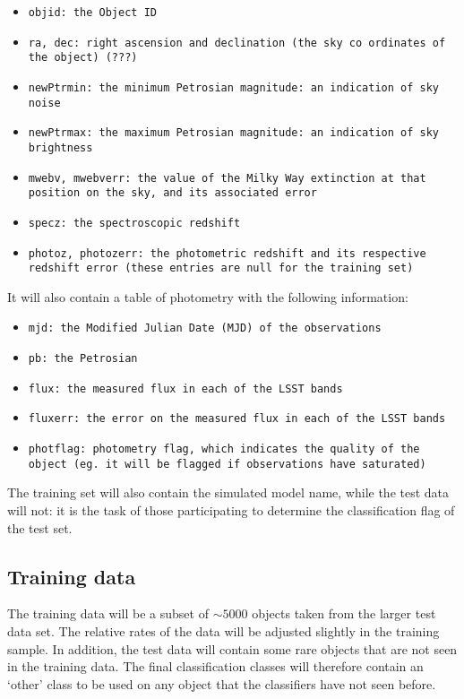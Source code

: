 \documentclass[\docopts]{\docclass}
\begin{document}
\begin{itemize}
\item \tt{objid}: the Object ID
\item \tt{ra, dec:} right ascension and declination (the sky co ordinates of the object) (???)
\item \tt{newPtrmin}: the minimum Petrosian magnitude: an indication of sky noise
\item \tt{newPtrmax}: the maximum Petrosian magnitude: an indication of sky brightness
\item \tt{mwebv, mwebverr}: the value of the Milky Way extinction at that position on the sky, and its associated error
\item \tt{specz}: the spectroscopic redshift
\item \tt{photoz, photozerr}: the photometric redshift and its respective redshift error (these entries are null for the training set)
\end{itemize}

It will also contain a table of photometry with the following information:
\begin{itemize}
\item \tt{mjd}: the Modified Julian Date (MJD) of the observations
\item \tt{pb}: the Petrosian 
\item \tt{flux}: the measured flux in each of the LSST bands
\item \tt{fluxerr}: the error on the measured flux in each of the LSST bands
\item \tt{photflag}: photometry flag, which indicates the quality of the object (eg. it will be flagged if observations have saturated)
\end{itemize}

The training set will also contain the simulated model name, while the test data will not: it is the task of those participating to determine the classification flag of the test set.

\subsection{Training data}
The training data will be a subset of $\sim 5000$ objects taken from the larger test data set. The relative rates of the data will be adjusted slightly in the training sample. In addition, the test data will contain some rare objects that are not seen in the training data. The final classification classes will therefore contain an `other' class to be used on any object that the classifiers have not seen before.
\end{document}
